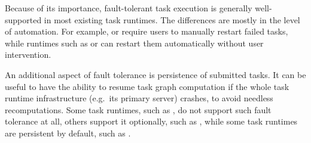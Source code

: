 Because of its importance, fault-tolerant task execution is generally well-supported in most
existing task runtimes. The differences are mostly in the level of automation. For example,
\fireworks{} or \merlin{} require users to manually restart failed tasks,
while runtimes such as \dask{} or \balsam{} can restart them
automatically without user intervention.

An additional aspect of fault tolerance is persistence of submitted tasks. It can be useful to have
the ability to resume task graph computation if the whole task runtime infrastructure (e.g.\ its
primary server) crashes, to avoid needless recomputations. Some task runtimes, such as
\dask{}, do not support such fault tolerance at all, others support it optionally,
such as \ray{}, while some task runtimes are persistent by default, such as
\balsam{}.

